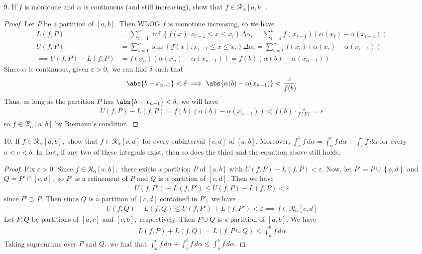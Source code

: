 \documentclass{article}
\begin{document}
\begin{itemize}
	\item[9.] If $f$ is monotone and $\alpha$ is continuous (and still increasing), show that $f\in \mathcal R_\alpha[a, b].$
		\begin{proof}
			Let $P$ be a partition of $[a, b].$ Then WLOG $f$ is monotone increasing, so we have
			\begin{align*}
				L(f, P) &= \sum_{i=1}^{n} \inf\left\{ f(x):x_{i-1}\le x\le x_i \right\}\Delta\alpha_i = \sum_{i=1}^{n} f(x_{i-1}) \left( \alpha(x_i)-\alpha(x_{i-1}) \right) \\
				U(f, P) &= \sum_{i=1}^{n} \sup\left\{ f(x):x_{i-1}\le x\le x_i \right\}\Delta\alpha_i = \sum_{i=1}^{n} f(x_i)\left( \alpha(x_i)-\alpha(x_{i-1}) \right) \\
				\implies U(f, P)-L(f, P) &= f(x_n)\left( \alpha(x_n)-\alpha(x_{n-1}) \right) = f(b)\left( \alpha(b)-\alpha(x_{n-1}) \right)
			\end{align*}
			Since $\alpha$ is continuous, given $\varepsilon>0,$ we can find $\delta$ such that
			\begin{align*}
				\abs{b-x_{n-1}}<\delta\implies \abs{\alpha(b)-\alpha(x_{n-1})} < \frac{\varepsilon}{f(b)}
			\end{align*}
			Thus, as long as the partition $P$ has $\abs{b-x_{n-1}}<\delta,$ we will have
			\begin{align*}
				U(f, P)-L(f, P) = f(b)\left( \alpha(b)-\alpha(x_{n-1}) \right) < f(b)\cdot \frac{\varepsilon}{f(b)} = \varepsilon
			\end{align*}
			so $f\in \mathcal R_\alpha[a, b]$ by Riemann's condition.
		\end{proof}

	\item[10.] If $f\in\mathcal R_\alpha[a, b],$ show that $f\in \mathcal R_\alpha[c, d]$ for every subinterval $[c, d]$ of $[a, b].$ Moreover, $\int_a^b f\, d\alpha = \int_a^c f\, d\alpha + \int_c^b f\, d\alpha$ for every $a<c<b.$ In fact, if any two of these integrals exist, then so does the third and the equation above still holds.
		\begin{proof}
			Fix $\varepsilon>0.$ Since $f\in \mathcal R_\alpha[a, b],$ there exists a partition $P$ of $[a, b]$ with $U(f, P)-L(f, P)<\varepsilon.$	Now, let $P'=P\cup\left\{ c, d \right\}$ and $Q=P'\cap[c, d],$ so $P'$ is a refinement of $P$ and $Q$ is a partition of $[c, d].$ Then we have
			\begin{align*}
				U(f, P')-L(f, P')\le U(f, P)-L(f, P) <\varepsilon
			\end{align*}
			since $P'\supset P.$ Then since $Q$ is a partition of $[c, d]$ contained in $P',$ we have
			\begin{align*}
				U(f, Q)-L(f, Q) \le U(f, P')+L(f, P')<\varepsilon\implies f\in \mathcal R_\alpha[c, d]
			\end{align*}
			Let $P, Q$ be partitions of $[a, c]$ and $[c, b],$ respectively. Then $P\cup Q$ is a partition of $[a, b].$ We have
			\begin{align*}
				L(f, P)+L(f, Q) = L(f, P\cup Q)\le \int_a^b f\, d\alpha
			\end{align*}
			Taking supremums over $P$ and $Q,$ we find that $\int_a^c f\, d\alpha + \int_c^b f\, d\alpha\le\int_a^b f\, d\alpha.$


\end{proof}
\end{itemize}
\end{document}
